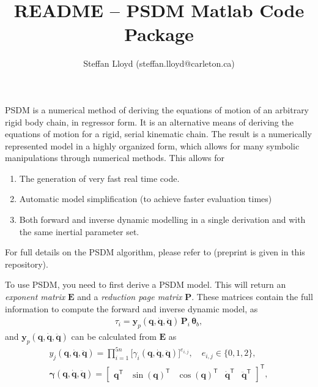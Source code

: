 \documentclass[12pt]{article}
\title{README -- PSDM Matlab Code Package}
\author{Steffan Lloyd (steffan.lloyd@carleton.ca)}
\renewcommand{\b}[1]{\mathbf{#1}}
\newcommand{\transpose}{\mathsf{T}}
\newcommand{\q}{\b{q}}
\newcommand{\qd}{\b{\dot{q}}}
\newcommand{\qdd}{\b{\ddot{q}}}
\newcommand{\bE}{\b{E}}
\newcommand{\bP}{\b{P}}
\renewcommand{\bP}{\b{P}}
\begin{document}
\maketitle

PSDM is a numerical method of deriving the equations of motion of an arbitrary rigid body chain, in regressor form. It is an alternative means of deriving the equations of motion for a rigid, serial kinematic chain. The result is a numerically represented model in a highly organized form, which allows for many symbolic manipulations through numerical methods. This allows for

\begin{enumerate}[itemsep=0pt,nosep]
 \item The generation of very fast real time code.
 \item Automatic model simplification (to achieve faster evaluation times)
 \item Both forward and inverse dynamic modelling in a single derivation and with the same inertial parameter set.
\end{enumerate}

For full details on the PSDM algorithm, please refer to \cite{Lloyd2021} (preprint is given in this repository).

To use PSDM, you need to first derive a PSDM model. This will return an \textit{exponent matrix} $\mathbf{E}$ and a \textit{reduction page matrix} $\mathbf{P}$. These matrices contain the full information to compute the forward and inverse dynamic model, as
\begin{align}\label{eq:ID}
	\tau_i = \mathbf{y}_p(\q, \qd, \qdd) \, \bP_i \, \mathbf{\theta}_b,
\end{align}
and $\b{y}_p(\q, \qd, \qdd)$ can be calculated from $\bE$ as
\begin{align}
		y_j(\q, \qd, \qdd) = \prod_{i=1}^{5n} \Big[\gamma_i(\q, \qd, \qdd)\Big]^{e_{i,j}}, \quad e_{i,j} \in \big\{0, 1, 2\big\},\\
		\b{\gamma}(\q, \qd, \qdd) = \begin{bmatrix}\q^\transpose & \sin(\q)^\transpose & \cos(\q)^\transpose & \qd^\transpose & \qdd ^\transpose \end{bmatrix}^\transpose,
\end{align}
\end{document}
